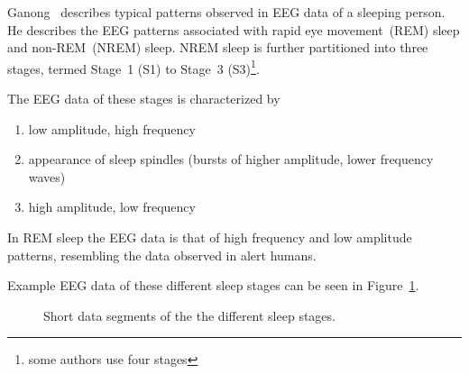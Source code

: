 Ganong~\cite[chapter~11]{Ganong1997} describes typical patterns observed in EEG data of a sleeping person. He describes the EEG patterns associated with rapid eye movement~(REM) sleep and non-REM~(NREM) sleep. NREM sleep is further partitioned into three stages, termed Stage~1 (S1) to Stage~3 (S3)\footnote{some authors use four stages}. 

The EEG data of these stages is characterized by

\begin{enumerate}[label={S\arabic*:}]
	\item low amplitude, high frequency
	\item appearance of sleep spindles (bursts of higher amplitude, lower frequency waves)
	\item high amplitude, low frequency
\end{enumerate}

In REM sleep the EEG data is that of high frequency and low amplitude patterns, resembling the data observed in alert humans.

Example EEG data of these different sleep stages can be seen in Figure~\ref{fig:different_sleep_stages}.

\begin{figure}
	\centering

	\begin{subfigure}[b]{\textwidth}
	\end{subfigure}
	
	\caption{Short data segments of the the different sleep stages.}
	\label{fig:different_sleep_stages}
\end{figure}
